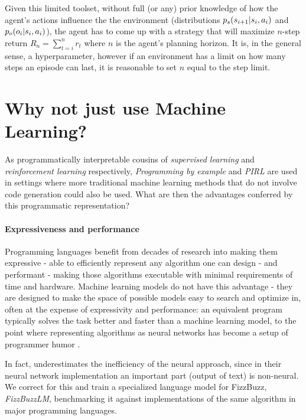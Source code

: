 Given this limited toolset, without full (or any) prior knowledge of how the agent's actions influence the the environment (distributions $p_s(s_{i+1} | s_i, a_i)$ and $p_o(o_i | s_i, a_i)$), the agent has to come up with a strategy that will maximize $n$-step return $R_n=\sum_{t=i}^{n} r_t$ where $n$ is the agent's planning horizon. It is, in the general sense, a hyperparameter, however if an environment has a limit on how many steps an episode can last, it is reasonable to set $n$ equal to the step limit. 

\newpage
\section{Why not just use Machine Learning?}

As programmatically interpretable cousins of \emph{supervised learning} and \emph{reinforcement learning} respectively, \emph{Programming by example} and \emph{PIRL} are  used in settings where more traditional machine learning methods that do not involve code generation could also be used.
What are then the advantages conferred by this programmatic representation?

\paragraph{Expressiveness and performance}

Programming languages benefit from decades of research into making them \textcolor{accent}{expressive} - able to efficiently represent any algorithm one can design - and \textcolor{accent}{performant} - making those algorithms executable with minimal requirements of time and hardware.
Machine learning models do not have this advantage - they are designed to make the space of possible models easy to search and optimize in, often at the expense of expressivity and performance: an equivalent program typically solves the task better and faster than a machine learning model, to the point where representing algorithms as neural networks has become a setup of programmer humor \cite{JoelGrusFizz}.

In fact, \cite{JoelGrusFizz} underestimates the inefficiency of the neural approach, since in their neural network implementation an important part (output of text) is non-neural.
We correct for this and train a specialized language model for FizzBuzz, \emph{FizzBuzzLM}, benchmarking it against implementations of the same algorithm in major programming languages.

